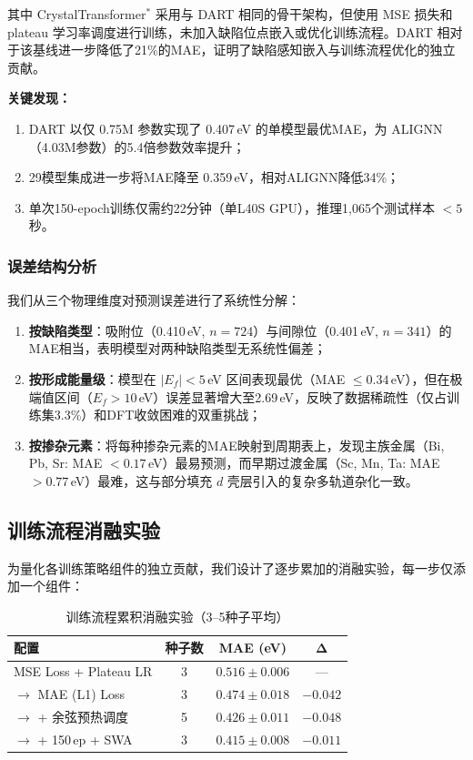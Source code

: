 其中 CrystalTransformer$^*$ 采用与 DART 相同的骨干架构，但使用 MSE 损失和 plateau 学习率调度进行训练，未加入缺陷位点嵌入或优化训练流程。DART 相对于该基线进一步降低了21\%的MAE，证明了缺陷感知嵌入与训练流程优化的独立贡献。

\textbf{关键发现：}
\begin{enumerate}
    \item DART 以仅 0.75M 参数实现了 0.407\,eV 的单模型最优MAE，为 ALIGNN（4.03M参数）的5.4倍参数效率提升；
    \item 29模型集成进一步将MAE降至 0.359\,eV，相对ALIGNN降低34\%；
    \item 单次150-epoch训练仅需约22分钟（单L40S GPU），推理1,065个测试样本 $<5$ 秒。
\end{enumerate}

\subsubsection{误差结构分析}

我们从三个物理维度对预测误差进行了系统性分解：

\begin{enumerate}
    \item \textbf{按缺陷类型}：吸附位（0.410\,eV, $n=724$）与间隙位（0.401\,eV, $n=341$）的MAE相当，表明模型对两种缺陷类型无系统性偏差；

    \item \textbf{按形成能量级}：模型在 $|E_f| < 5$\,eV 区间表现最优（MAE $\leq 0.34$\,eV），但在极端值区间（$E_f > 10$\,eV）误差显著增大至2.69\,eV，反映了数据稀疏性（仅占训练集3.3\%）和DFT收敛困难的双重挑战；

    \item \textbf{按掺杂元素}：将每种掺杂元素的MAE映射到周期表上，发现主族金属（Bi, Pb, Sr: MAE $< 0.17$\,eV）最易预测，而早期过渡金属（Sc, Mn, Ta: MAE $> 0.77$\,eV）最难，这与部分填充 $d$ 壳层引入的复杂多轨道杂化一致。
\end{enumerate}

\subsection{训练流程消融实验}

为量化各训练策略组件的独立贡献，我们设计了逐步累加的消融实验，每一步仅添加一个组件：

\begin{table}[h]
\centering
\caption{训练流程累积消融实验（3--5种子平均）}
\begin{tabular}{lccc}
\toprule
\textbf{配置} & \textbf{种子数} & \textbf{MAE (eV)} & $\boldsymbol{\Delta}$ \\
\midrule
MSE Loss + Plateau LR & 3 & $0.516 \pm 0.006$ & --- \\
$\to$ MAE (L1) Loss & 3 & $0.474 \pm 0.018$ & $-0.042$ \\
$\to$ + 余弦预热调度 & 5 & $0.426 \pm 0.011$ & $-0.048$ \\
$\to$ + 150\,ep + SWA & 3 & $0.415 \pm 0.008$ & $-0.011$ \\
\bottomrule
\end{tabular}
\end{table}


